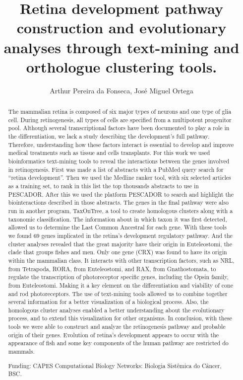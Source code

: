 \documentclass[twoside]{article}
\title{\vspace{-15mm}\fontsize{24pt}{10pt}\selectfont\textbf{ Retina development pathway construction and evolutionary analyses through text-mining and orthologue clustering tools. }} %
\author{ Arthur Pereira da Fonseca, Jos\'e Miguel Ortega }
\affil{ Universidade Federal de Minas Gerais }
\date{}
\begin{document}
  
  
  \maketitle %
  
  
  \thispagestyle{fancy} %
  
  
  \begin{abstract}
  The mammalian retina is composed of six major types of neurons and one type of glia cell. During retinogenesis,  all types of cells are specified from a multipotent progenitor pool. Although several transcriptional factors have been documented to play a role in the differentiation,  we lack a study describing the development’s full pathway. Therefore,  understanding how these factors interact is essential to develop and improve medical treatments such as tissue and cells transplants. For this work we used bioinformatics text-mining tools to reveal the interactions between the genes involved in retinogenesis. First was made a list of abstracts with a PubMed query search for “retina development”. Then we used the Medline ranker tool,  with six selected articles as a training set,  to rank in this list the top thousands abstracts to use in PESCADOR.  After this we used the platform PESCADOR to search and highlight the biointeractions described in those abstracts.  The genes in the final pathway were also run in another program,  TaxOnTree,  a tool to create homologous clusters along with a taxonomic classification. The information about in which taxon it was first detected,  allowed us to determine the Last Common Ancestral for each gene.  With these tools we found 69 genes implicated in the retina’s development regulatory pathway. And the cluster analyses revealed that the great majority have their origin in Euteleostomi,  the clade that groups fishes and men. Only one gene (CRX) was found to have its origin within the mammalian class. It interacts with other transcription factors,  such as NRL,  from Tetrapoda,  RORA,  from Euteleostomi,  and RAX,  from Gnathostomata,  to regulate the transcription of photoreceptor specific genes,  including the Opsin family,  from Euteleostomi. Making it a key element on the differentiation and viability of cone and rod photoreceptors.  The use of text-mining tools allowed us to combine together several information for a better visualization of a biological process. Also,  the homologous cluster analyses enabled a better understanding about the evolutionary process,  and to extend this visualization for other organisms. In conclusion,  with these tools we were able to construct and analyze the retinogenesis pathway and probable origin of their genes. Evolution of retina’s development appears to occur with the appearance of fish and some key components of the human pathway are restricted do mammals.
  
  Funding: CAPES Computational Biology Networks: Biologia Sist\^emica do C\^ancer,  BSC. \\ 
  \end{abstract}
  
\end{document}
